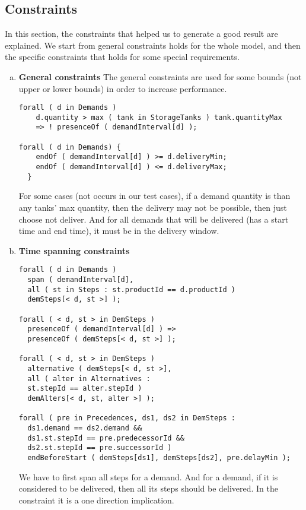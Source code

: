 \documentclass[a4paper, 12pt]{article}
\begin{document}
\subsection{Constraints}

In this section, the constraints that helped us to generate a good result are explained. We start from general constraints holds for the whole model, and then the specific constraints that holds for some special requirements. 

\begin{enumerate}[a.~]
\item \textbf{General constraints}
The general constraints are used for some bounds (not upper or lower bounds) in order to increase performance. 
\begin{lstlisting}
forall ( d in Demands )
    d.quantity > max ( tank in StorageTanks ) tank.quantityMax 
    => ! presenceOf ( demandInterval[d] );

forall ( d in Demands) {
    endOf ( demandInterval[d] ) >= d.deliveryMin;
    endOf ( demandInterval[d] ) <= d.deliveryMax;
  }
\end{lstlisting}
For some cases (not occurs in our test cases), if a demand quantity is  than any tanks' max quantity, then the delivery may not be possible, then just choose not deliver. And for all demands that will be delivered (has a start time and end time), it must be in the delivery window. 
\item \textbf{Time spanning constraints}
\begin{lstlisting}
forall ( d in Demands )
  span ( demandInterval[d], 
  all ( st in Steps : st.productId == d.productId )
  demSteps[< d, st >] );

forall ( < d, st > in DemSteps )
  presenceOf ( demandInterval[d] ) => 
  presenceOf ( demSteps[< d, st >] );

forall ( < d, st > in DemSteps )
  alternative ( demSteps[< d, st >], 
  all ( alter in Alternatives :
  st.stepId == alter.stepId ) 
  demAlters[< d, st, alter >] );

forall ( pre in Precedences, ds1, ds2 in DemSteps :
  ds1.demand == ds2.demand && 
  ds1.st.stepId == pre.predecessorId && 
  ds2.st.stepId == pre.successorId )
  endBeforeStart ( demSteps[ds1], demSteps[ds2], pre.delayMin );
\end{lstlisting}
We have to first span all steps for a demand. And for a demand, if it is considered to be delivered, then all its steps should be delivered. In the constraint it is a one direction implication. 


\end{enumerate}
\end{document}
